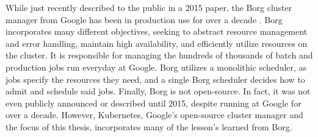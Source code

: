 While just recently described to the public in a 2015 paper, the
Borg cluster manager from Google has been in production use for over a
decade \cite{borg}. Borg incorporates
many different objectives, seeking to abstract resource management and error
handling, maintain high availability, and efficiently utilize resources on the
cluster. It is responsible for managing the hundreds of
thousands of batch and production jobs run everyday at Google.
Borg utilizes a monolithic scheduler, as jobs specify the
resources they need, and a single Borg scheduler decides how to admit and
schedule said jobs. Finally, Borg is not open-source. In fact, it was not even
publicly announced or described until 2015, despite running at Google for over a
decade. However, Kubernetes, Google's open-source cluster manager and the focus
of this thesis, incorporates many of the lesson's learned from Borg.
